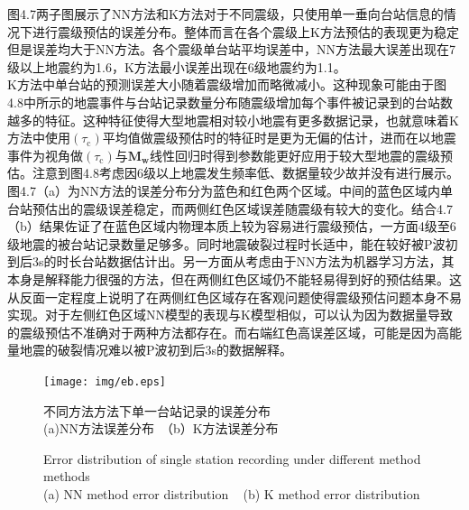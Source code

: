 \indent 图4.7两子图展示了NN方法和K方法对于不同震级，只使用单一垂向台站信息的情况下进行震级预估的误差分布。整体而言在各个震级上K方法预估的表现更为稳定但是误差均大于NN方法。各个震级单台站平均误差中，NN方法最大误差出现在7级以上地震约为1.6，K方法最小误差出现在6级地震约为1.1。\\
\indent K方法中单台站的预测误差大小随着震级增加而略微减小。这种现象可能由于图4.8中所示的地震事件与台站记录数量分布随震级增加每个事件被记录到的台站数越多的特征。这种特征使得大型地震相对较小地震有更多数据记录，也就意味着K方法中使用$\left(\tau_{\mathrm{c}}\right)$平均值做震级预估时的特征时是更为无偏的估计，进而在以地震事件为视角做$\left(\tau_{\mathrm{c}}\right)$与$\mathbf{M}_{\mathbf{w}}$线性回归时得到参数能更好应用于较大型地震的震级预估。注意到图4.8考虑因6级以上地震发生频率低、数据量较少故并没有进行展示。\\
\indent 图4.7（a）为NN方法的误差分布分为蓝色和红色两个区域。中间的蓝色区域内单台站预估出的震级误差稳定，而两侧红色区域误差随震级有较大的变化。结合4.7（b）结果佐证了在蓝色区域内物理本质上较为容易进行震级预估，一方面4级至6级地震的被台站记录数量足够多。同时地震破裂过程时长适中，能在较好被P波初到后3s的时长台站数据估计出。另一方面从考虑由于NN方法为机器学习方法，其本身是解释能力很强的方法，但在两侧红色区域仍不能轻易得到好的预估结果。这从反面一定程度上说明了在两侧红色区域存在客观问题使得震级预估问题本身不易实现。对于左侧红色区域NN模型的表现与K模型相似，可以认为因为数据量导致的震级预估不准确对于两种方法都存在。而右端红色高误差区域，可能是因为高能量地震的破裂情况难以被P波初到后3s的数据解释。\\
\begin{figure}[!h] 
\centering 
\texttt{[image: img/eb.eps]} 
\renewcommand{\figurename}{图} 
\caption{不同方法方法下单一台站记录的误差分布\\
(a)NN方法误差分布~（b）K方法误差分布} 
\addtocounter{figure}{-1} \vspace{-5pt} 
\renewcommand{\figurename}{Fig} 
\caption{Error distribution of single station recording under different method methods\\
(a) NN method error distribution ~ (b) K method error distribution} 
\renewcommand{\figurename}{图} 
\label{fig:network-device-influence.png} 
\end{figure}
